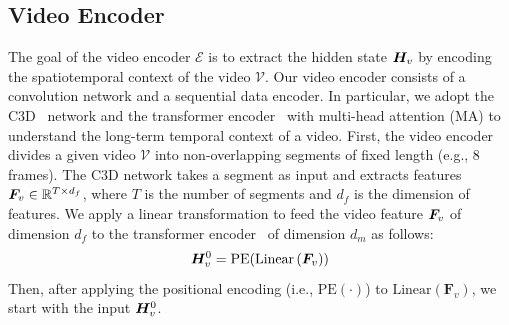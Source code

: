 \subsection{Video Encoder}
The goal of the video encoder $\mathcal{E}$ is to extract the hidden state $\bm{H}_v$ by encoding the spatiotemporal context of the video $\mathcal{V}$.
Our video encoder consists of a convolution network and a sequential data encoder.
In particular, we adopt the C3D~\cite{tran2015learning} network and the transformer encoder~\cite{vaswani2017attention} with multi-head attention (MA) to understand the long-term temporal context of a video.
First, the video encoder divides a given video $\mathcal{V}$ into non-overlapping segments of fixed length (e.g., 8 frames).
The C3D network takes a segment as input and extracts features $\bm{F}_v \in \mathbb{R}^{T \times d_f}$, where $T$ is the number of segments and $d_f$ is the dimension of features.
We apply a linear transformation to feed the video feature $\bm{F}_v$ of dimension $d_f$ to the transformer encoder~\cite{vaswani2017attention} of dimension $d_m$ as follows:
\begin{equation}
  \bm{H}_v^0 = \text{PE} (\text{Linear} \left( \bm{F}_v \right) )
  \label{eq:linear_transformation}
\end{equation}
Then, after applying the positional encoding (i.e., $\text{PE}(\cdot)$) to $\text{Linear}(\bm{F}_v)$, we start with the input $\bm{H}_v^0$.

